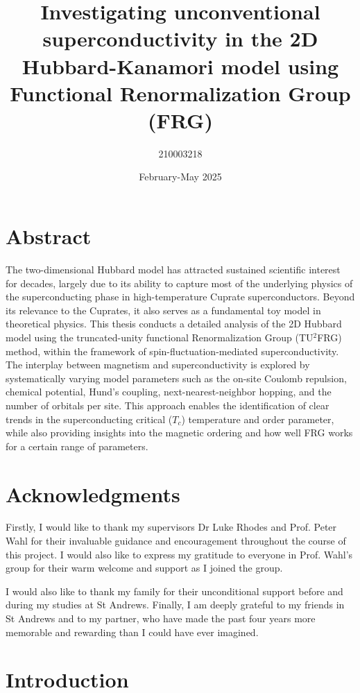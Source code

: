 \documentclass[11pt]{article}
\title{Investigating unconventional superconductivity in the 2D Hubbard-Kanamori model using Functional Renormalization Group (FRG)}
\author{210003218}
\date{February-May 2025}
\begin{document}
\maketitle
\tableofcontents 

\newpage 

\section{Abstract}



The two-dimensional Hubbard model has attracted sustained scientific interest for decades, largely due to its ability to capture most of the underlying physics of the superconducting phase in high-temperature Cuprate superconductors\cite{dagotto1994correlated}. 
Beyond its relevance to the Cuprates, it also serves as a fundamental toy model in theoretical physics. 
This thesis conducts a detailed analysis of the 2D Hubbard model using the truncated-unity functional Renormalization Group (TU$^2$FRG) method,
within the framework of spin-fluctuation-mediated superconductivity.  The interplay between magnetism and superconductivity is explored 
by systematically varying model parameters such as the on-site Coulomb repulsion, chemical potential, Hund's coupling, next-nearest-neighbor hopping, and the number of orbitals per
site. This approach enables the identification of clear trends in the superconducting critical ($T_c$) temperature and order parameter, while also
providing insights into the magnetic ordering and how well FRG works for a certain range of parameters.


\section{Acknowledgments}

Firstly, I would like to thank my supervisors Dr Luke Rhodes and Prof. Peter Wahl for their invaluable guidance and encouragement throughout the course of this 
project. I would also like to express my gratitude to everyone in Prof. Wahl's group for their warm welcome 
and support as I joined the group. \par
\medskip
\noindent I would also like to thank my family for their unconditional support before and during 
my studies at St Andrews. Finally, I am deeply grateful to my friends in St Andrews and to my partner, who have
made the past four years more memorable and rewarding than I could have ever imagined.  


\section{Introduction}
\end{document}
